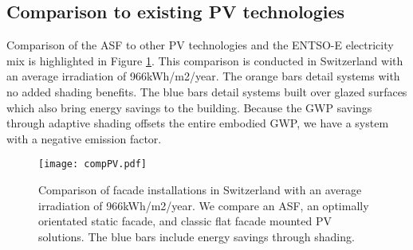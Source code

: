 \subsection{Comparison to existing PV technologies}

Comparison of the ASF to other PV technologies and the ENTSO-E electricity mix is highlighted in Figure \ref{fig:compPV}. This comparison is conducted in Switzerland with an average irradiation of 966kWh/m2/year.
The orange bars detail systems with no added shading benefits. The blue bars detail systems built over glazed surfaces which also bring energy savings to the building. Because the GWP savings through adaptive shading offsets the entire embodied GWP, we have a system with a negative emission factor.




\begin{figure}[H]
\begin{center}
\texttt{[image: compPV.pdf]}
\caption{Comparison of facade installations in Switzerland with an average irradiation of 966kWh/m2/year.
We compare an ASF, an optimally orientated static facade, and classic flat facade mounted PV solutions. The blue bars include energy savings through shading.}
\label{fig:compPV}
\end{center}
\end{figure}






